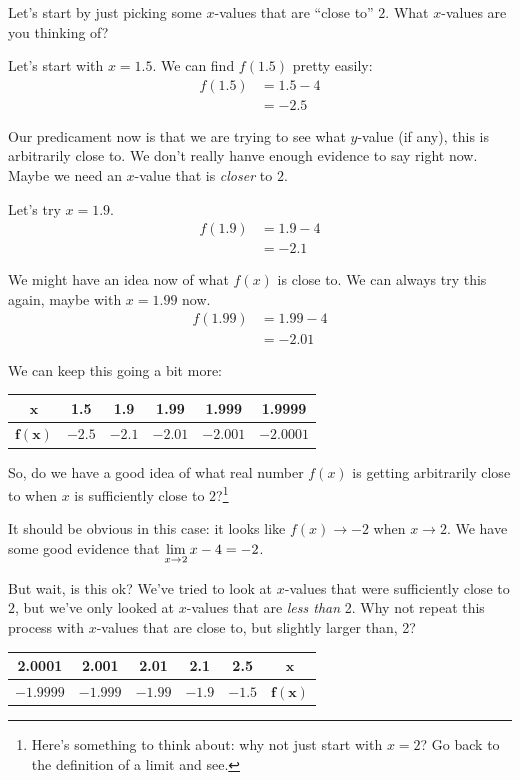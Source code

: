 Let's start by just picking some $x$-values that are ``close to'' $2$.
What $x$-values are you thinking of?

Let's start with $x=1.5$.
We can find $f(1.5)$ pretty easily:
\begin{align*}
  f(1.5) & = 1.5-4\\
  & = -2.5
\end{align*}

Our predicament now is that we are trying to see what $y$-value (if any), this is arbitrarily close to.
We don't really hanve enough evidence to say right now.
Maybe we need an $x$-value that is \textit{closer} to $2$.

Let's try $x=1.9$.
\begin{align*}
  f(1.9) & = 1.9-4\\
  & = -2.1
\end{align*}

We might have an idea now of what $f(x)$ is close to.
We can always try this again, maybe with $x=1.99$ now.
\begin{align*}
  f(1.99) & = 1.99-4\\
  & = -2.01
\end{align*}

We can keep this going a bit more:

\begin{center}
  \begin{tabular}{cccccc} \toprule
    $\bm{x}$ & 1.5 & 1.9 & 1.99 & 1.999 & 1.9999\\ \midrule
    $\bm{f(x)}$ & $-2.5$ & $-2.1$ & $-2.01$ & $-2.001$ & $-2.0001$\\ \bottomrule
  \end{tabular}
\end{center}

So, do we have a good idea of what real number $f(x)$ is getting arbitrarily close to when $x$ is sufficiently close to $2$?\footnote{Here's something to think about: why not just start with $x=2$? Go back to the definition of a limit and see.}

It should be obvious in this case: it looks like $f(x) \to -2$ when $x\to 2$.
We have some good evidence that $\displaystyle \lim_{x\to 2}x-4 = -2$.

But wait, is this ok? We've tried to look at $x$-values that were sufficiently close to $2$, but we've only looked at $x$-values that are \textit{less than} 2.
Why not repeat this process with $x$-values that are close to, but slightly larger than, 2?

\begin{center}
  \begin{tabular}{cccccc} \toprule
    2.0001 & 2.001 & 2.01 & 2.1 & 2.5 & $\bm{x}$\\ \midrule
    $-1.9999$ & $-1.999$ & $-1.99$ & $-1.9$ & $-1.5$ & $\bm{f(x)}$ \\ \bottomrule
  \end{tabular}
\end{center}

